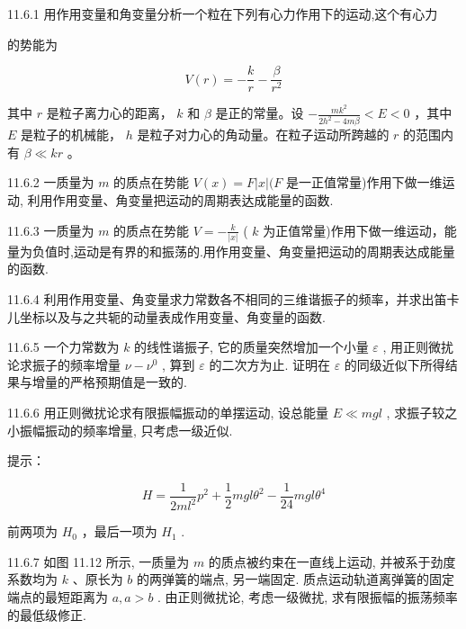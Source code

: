 \begin{problem}{11.6.1}
用作用变量和角变量分析一个粒在下列有心力作用下的运动,这个有心力

的势能为

\[
V (r) = - \frac {k}{r} - \frac {\beta}{r ^ {2}}
\]

其中 $r$ 是粒子离力心的距离， $k$ 和 $\beta$ 是正的常量。设 $-\frac{mk^2}{2h^2 - 4m\beta} < E < 0$ ，其中 $E$ 是粒子的机械能， $h$ 是粒子对力心的角动量。在粒子运动所跨越的 $r$ 的范围内有 $\beta \ll kr$ 。
\end{problem}
\clearpage


\begin{problem}{11.6.2}
一质量为 $m$ 的质点在势能 $V(x) = F|x|(F$ 是一正值常量)作用下做一维运动, 利用作用变量、角变量把运动的周期表达成能量的函数.
\end{problem}
\clearpage


\begin{problem}{11.6.3}
一质量为 $m$ 的质点在势能 $V = -\frac{k}{|x|}$ ( $k$ 为正值常量)作用下做一维运动，能量为负值时,运动是有界的和振荡的.用作用变量、角变量把运动的周期表达成能量的函数.
\end{problem}
\clearpage


\begin{problem}{11.6.4}
利用作用变量、角变量求力常数各不相同的三维谐振子的频率，并求出笛卡儿坐标以及与之共轭的动量表成作用变量、角变量的函数.
\end{problem}
\clearpage


\begin{problem}{11.6.5}
一个力常数为 $k$ 的线性谐振子, 它的质量突然增加一个小量 $\varepsilon$ , 用正则微扰论求振子的频率增量 $\nu - \nu^0$ , 算到 $\varepsilon$ 的二次方为止. 证明在 $\varepsilon$ 的同级近似下所得结果与增量的严格预期值是一致的.
\end{problem}
\clearpage


\begin{problem}{11.6.6}
用正则微扰论求有限振幅振动的单摆运动, 设总能量 $E \ll mgl$ , 求振子较之小振幅振动的频率增量, 只考虑一级近似.

提示：

\[
H = \frac {1}{2 m l ^ {2}} p ^ {2} + \frac {1}{2} m g l \theta^ {2} - \frac {1}{2 4} m g l \theta^ {4}
\]

前两项为 $H_{0}$ ，最后一项为 $H_{1}$ .
\end{problem}
\clearpage


\begin{problem}{11.6.7}
如图 11.12 所示, 一质量为 $m$ 的质点被约束在一直线上运动, 并被系于劲度系数均为 $k$ 、原长为 $b$ 的两弹簧的端点, 另一端固定. 质点运动轨道离弹簧的固定端点的最短距离为 $a, a > b$ . 由正则微扰论, 考虑一级微扰, 求有限振幅的振荡频率的最低级修正.
\begin{center}

\end{center}
\end{problem}
\clearpage


